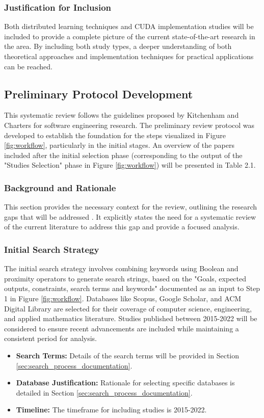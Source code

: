 \subsubsection{Justification for Inclusion}
Both distributed learning techniques and CUDA implementation studies will be included to provide a
complete picture of the current state-of-the-art research in the area. By including both study
types, a deeper understanding of both theoretical approaches and implementation techniques for
practical applications can be reached.

\subsection{Preliminary Protocol Development}
This systematic review follows the guidelines proposed by Kitchenham and Charters for software
engineering research. The preliminary review protocol was developed to establish the foundation for
the steps visualized in Figure \ref{fig:workflow}, particularly in the initial stages. An overview
of the papers included after the initial selection phase (corresponding to the output of the
"Studies Selection" phase in Figure \ref{fig:workflow}) will be presented in Table 2.1.

\subsubsection{Background and Rationale}
This section provides the necessary context for the review, outlining the research gaps that will
be addressed \cite{ben-nun_demystifying_2020}. It explicitly states the need for a systematic
review of the current literature to address this gap and provide a focused analysis.

\subsubsection{Initial Search Strategy}
The initial search strategy involves combining keywords using Boolean and proximity operators to
generate search strings, based on the "Goals, expected outputs, constraints, search terms and
keywords" documented as an input to Step 1 in Figure \ref{fig:workflow}. Databases like Scopus,
Google Scholar, and ACM Digital Library are selected for their coverage of computer science,
engineering, and applied mathematics literature. Studies published between 2015-2022 will be
considered to ensure recent advancements are included while maintaining a consistent period for
analysis.
\begin{itemize}
	\item \textbf{Search Terms:} Details of the search terms will be provided in Section \ref{sec:search_process_documentation}.
	\item \textbf{Database Justification:} Rationale for selecting specific databases is detailed in Section \ref{sec:search_process_documentation}.
	\item \textbf{Timeline:} The timeframe for including studies is 2015-2022.
\end{itemize}

